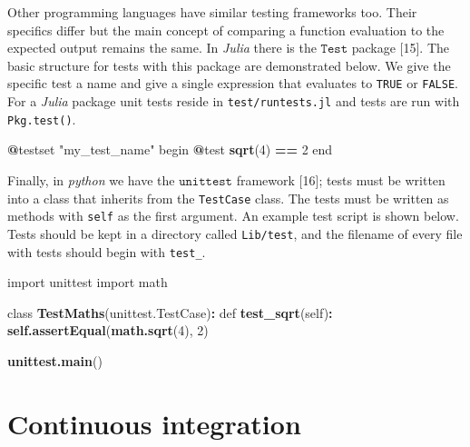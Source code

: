 \documentclass[10pt,letterpaper]{article}
\newenvironment{Shaded}{\begin{snugshade}}{\end{snugshade}}
\newcommand{\DecValTok}[1]{\textcolor[rgb]{0.00,0.00,0.81}{#1}}
\newcommand{\KeywordTok}[1]{\textcolor[rgb]{0.13,0.29,0.53}{\textbf{#1}}}
\newcommand{\NormalTok}[1]{#1}
\newcommand{\OperatorTok}[1]{\textcolor[rgb]{0.81,0.36,0.00}{\textbf{#1}}}
\newcommand{\StringTok}[1]{\textcolor[rgb]{0.31,0.60,0.02}{#1}}
\begin{document}
Other programming languages have similar testing frameworks too.
Their specifics differ but the main concept of comparing a function evaluation to the expected output remains the same.
In \emph{Julia} there is the \(\texttt{Test}\) package {[}15{]}.
The basic structure for tests with this package are demonstrated below.
We give the specific test a name and give a single expression that evaluates to \texttt{TRUE} or \texttt{FALSE}.
For a \emph{Julia} package unit tests reside in \texttt{test/runtests.jl} and tests are run with \texttt{Pkg.test()}.
\newline
{}\label{juliatest}

\begin{Shaded}
\begin{Highlighting}[]
\OperatorTok{@}\NormalTok{testset }\StringTok{"my_test_name"}\NormalTok{ begin}
  \OperatorTok{@}\NormalTok{test }\KeywordTok{sqrt}\NormalTok{(}\DecValTok{4}\NormalTok{) }\OperatorTok{==}\StringTok{ }\DecValTok{2}
\NormalTok{end}
\end{Highlighting}
\end{Shaded}

Finally, in \emph{python} we have the \(\texttt{unittest}\) framework {[}16{]}; tests must be written into a class that inherits from the \texttt{TestCase} class.
The tests must be written as methods with \texttt{self} as the first argument.
An example test script is shown below.
Tests should be kept in a directory called \texttt{Lib/test}, and the filename of every file with tests should begin with \texttt{test\_}.
\newline
{}\label{testpy}

\begin{Shaded}
\begin{Highlighting}[]
\NormalTok{import unittest}
\NormalTok{import math}

\NormalTok{class }\KeywordTok{TestMaths}\NormalTok{(unittest.TestCase)}\OperatorTok{:}
\StringTok{    }\NormalTok{def }\KeywordTok{test_sqrt}\NormalTok{(self)}\OperatorTok{:}
\StringTok{        }\KeywordTok{self.assertEqual}\NormalTok{(}\KeywordTok{math.sqrt}\NormalTok{(}\DecValTok{4}\NormalTok{), }\DecValTok{2}\NormalTok{)}

\KeywordTok{unittest.main}\NormalTok{()}
\end{Highlighting}
\end{Shaded}

\hypertarget{ci}{%
\section{Continuous integration}\label{ci}}
\end{document}
